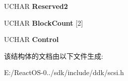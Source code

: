 \begin{DoxyCompactItemize}
\item 
\mbox{\label{struct___c_d_b_1_1___s_y_n_c_h_r_o_n_i_z_e___c_a_c_h_e10_a0b61da4a63e94e429c0c5529e6640d98}} 
U\+C\+H\+AR {\bfseries Reserved2}
\item 
\mbox{\label{struct___c_d_b_1_1___s_y_n_c_h_r_o_n_i_z_e___c_a_c_h_e10_a0d6ca728a458f997a43e48c5ae99d18a}} 
U\+C\+H\+AR {\bfseries Block\+Count} \mbox{[}2\mbox{]}
\item 
\mbox{\label{struct___c_d_b_1_1___s_y_n_c_h_r_o_n_i_z_e___c_a_c_h_e10_ae55dc73c22a85581a14bd4639951acfb}} 
U\+C\+H\+AR {\bfseries Control}
\end{DoxyCompactItemize}


该结构体的文档由以下文件生成\+:\begin{DoxyCompactItemize}
\item 
E\+:/\+React\+O\+S-\/0../sdk/include/ddk/scsi.\+h\end{DoxyCompactItemize}
